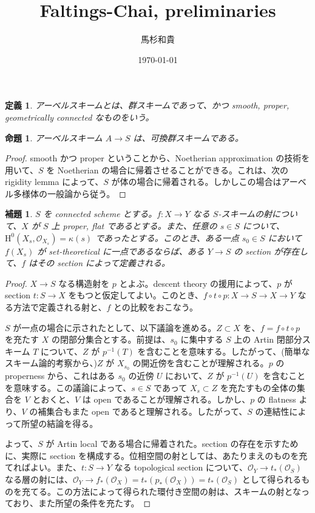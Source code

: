 \documentclass{jsarticle}
\title{Faltings-Chai, preliminaries}
\author{馬杉和貴}
\date{\today}
\renewcommand{\H}{\mathrm{H}}
\newcommand{\res}{\kappa}
\newtheorem{prop}[thm]{命題}
\newtheorem{lem}[thm]{補題}
\newtheorem{defn}[thm]{定義}
\begin{document}
\maketitle

\section{}
\begin{defn}
  アーベルスキームとは、群スキームであって、かつ smooth, proper, geometrically connected なものをいう。
\end{defn}

\begin{prop}
  アーベルスキーム $A \to S$ は、可換群スキームである。
\end{prop}
\begin{proof}
  smooth かつ proper ということから、Noetherian approximation の技術を用いて、$S$ を Noetherian の場合に帰着させることができる。これは、次の rigidity lemma によって、$S$ が体の場合に帰着される。しかしこの場合はアーベル多様体の一般論から従う。
\end{proof}

\begin{lem}
  $S$ を connected scheme とする。$f \colon X \to Y$ なる $S$-スキームの射について、$X$ が $S$ 上 proper, flat であるとする。また、任意の $s \in S$ について、$\H^0(X_s, \mathcal{O}_{X_s}) = \res(s)$ であったとする。このとき、ある一点 $s_0 \in S$ において $f(X_s)$ が set-theoretical に一点であるならば、ある $Y \to S$ の section が存在して、$f$ はその section によって定義される。
\end{lem}
\begin{proof}
  $X \to S$ なる構造射を $p$ とよぶ。descent theory の援用によって、$p$ が section $t \colon S \to X$ をもつと仮定してよい。このとき、$f \circ t \circ p : X \to S \to X \to Y$ なる方法で定義される射と、$f$ との比較をおこなう。

  $S$ が一点の場合に示されたとして、以下議論を進める。$Z \subset X$ を、$f = f \circ t \circ p$ を充たす $X$ の閉部分集合とする。前提は、$s_0$ に集中する $S$ 上の Artin 閉部分スキーム $T$ について、$Z$ が $p^{-1}(T)$ を含むことを意味する。したがって、(簡単なスキーム論的考察から、)$Z$ が $X_{s_0}$ の開近傍を含むことが理解される。$p$ の properness から、これはある $s_0$ の近傍 $U$ において、$Z$ が $p^{-1}(U)$ を含むことを意味する。この議論によって、$s \in S$ であって $X_s \subset Z$ を充たすもの全体の集合を $V$ とおくと、$V$ は open であることが理解される。しかし、$p$ の flatness より、$V$ の補集合もまた open であると理解される。したがって、$S$ の連結性によって所望の結論を得る。

  よって、$S$ が Artin local である場合に帰着された。section の存在を示すために、実際に section を構成する。位相空間の射としては、あたりまえのものを充てればよい。また、$t \colon S \to Y$ なる topological section について、$\mathcal{O}_Y \to t_*(\mathcal{O}_S)$ なる層の射には、$\mathcal{O}_Y \to f_*(\mathcal{O}_X) = t_*(p_*(\mathcal{O}_X)) = t_*(\mathcal{O}_S)$ として得られるものを充てる。この方法によって得られた環付き空間の射は、スキームの射となっており、また所望の条件を充たす。
\end{proof}
\end{document}
